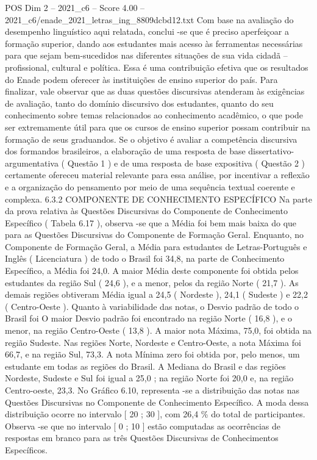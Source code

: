 \begin{textsample}{POS Dim 2 – 2021\_c6 – Score 4.00 – 2021\_c6/enade\_2021\_letras\_ing\_8809dcbd12.txt}
Com base na avaliação do desempenho linguístico aqui relatada, conclui -se que é preciso aperfeiçoar a formação superior, dando aos estudantes mais acesso às ferramentas necessárias para que sejam bem-sucedidos nas diferentes situações de sua vida cidadã – profissional, cultural e política.
Essa é uma contribuição efetiva que os resultados do Enade podem oferecer às instituições de ensino superior do país.
Para finalizar, vale observar que as duas questões discursivas atenderam às exigências de avaliação, tanto do domínio discursivo dos estudantes, quanto do seu conhecimento sobre temas relacionados ao conhecimento acadêmico, o que pode ser extremamente útil para que os cursos de ensino superior possam contribuir na formação de seus graduandos.
Se o objetivo é avaliar a competência discursiva dos formandos brasileiros, a elaboração de uma resposta de base dissertativo-argumentativa ( Questão 1 ) e de uma resposta de base expositiva ( Questão 2 ) certamente ofereceu material relevante para essa análise, por incentivar a reflexão e a organização do pensamento por meio de uma sequência textual coerente e complexa. 6.3.2 COMPONENTE DE CONHECIMENTO ESPECÍFICO Na parte da prova relativa às Questões Discursivas do Componente de Conhecimento Específico ( Tabela 6.17 ), observa -se que a Média foi bem mais baixa do que para as Questões Discursivas do Componente de Formação Geral.
Enquanto, no Componente de Formação Geral, a Média para estudantes de Letras-Português e Inglês ( Licenciatura ) de todo o Brasil foi 34,8, na parte de Conhecimento Específico, a Média foi 24,0.
A maior Média deste componente foi obtida pelos estudantes da região Sul ( 24,6 ), e a menor, pelos da região Norte ( 21,7 ).
As demais regiões obtiveram Média igual a 24,5 ( Nordeste ), 24,1 ( Sudeste ) e 22,2 ( Centro-Oeste ).
Quanto à variabilidade das notas, o Desvio padrão de todo o Brasil foi O maior Desvio padrão foi encontrado na região Norte ( 16,8 ), e o menor, na região Centro-Oeste ( 13,8 ).
A maior nota Máxima, 75,0, foi obtida na região Sudeste.
Nas regiões Norte, Nordeste e Centro-Oeste, a nota Máxima foi 66,7, e na região Sul, 73,3.
A nota Mínima zero foi obtida por, pelo menos, um estudante em todas as regiões do Brasil.
A Mediana do Brasil e das regiões Nordeste, Sudeste e Sul foi igual a 25,0 ; na região Norte foi 20,0 e, na região Centro-oeste, 23,3.
No Gráfico 6.10, representa -se a distribuição das notas nas Questões Discursivas no Componente de Conhecimento Específico.
A moda dessa distribuição ocorre no intervalo [ 20 ; 30 ], com 26,4 \% do total de participantes.
Observa -se que no intervalo [ 0 ; 10 ] estão computadas as ocorrências de respostas em branco para as três Questões Discursivas de Conhecimentos Específicos.

\end{textsample}
